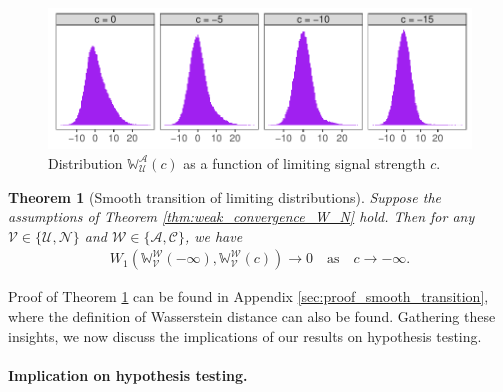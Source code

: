 \documentclass[12pt]{article}
\newtheorem{theorem}{Theorem}
\begin{document}
\begin{figure}[!ht]
    \centering
    \includegraphics[width=.85\textwidth]{figures-and-tables/auxiliary/asymptotic_distribution.pdf}
    \caption{Distribution \(\mathbb{W}_{\mathcal{U}}^{\mathcal{A}}(c)\) as a function of limiting signal strength $c$.}
    \label{fig:transition}
\end{figure}

\begin{theorem}[Smooth transition of limiting distributions]\label{thm:smooth_transition}
	Suppose the assumptions of Theorem \ref{thm:weak_convergence_W_N} hold. Then for any $\mathcal{V}\in \{\mathcal{U},\mathcal{N}\}$ and $\mathcal{W}\in \{\mathcal{A},\mathcal{C}\}$, we have
	\begin{align*}
		W_1(\mathbb{W}_{\mathcal{V}}^{\mathcal{W}}(-\infty), \mathbb{W}_{\mathcal{V}}^{\mathcal{W}}(c))\rightarrow0\quad\text{as}\quad c\rightarrow-\infty.
	\end{align*}
\end{theorem}

\noindent Proof of Theorem \ref{thm:smooth_transition} can be found in Appendix \ref{sec:proof_smooth_transition}, where the definition of Wasserstein distance can also be found. Gathering these insights, we now discuss the implications of our results on hypothesis testing.

\paragraph{Implication on hypothesis testing.}
\end{document}
